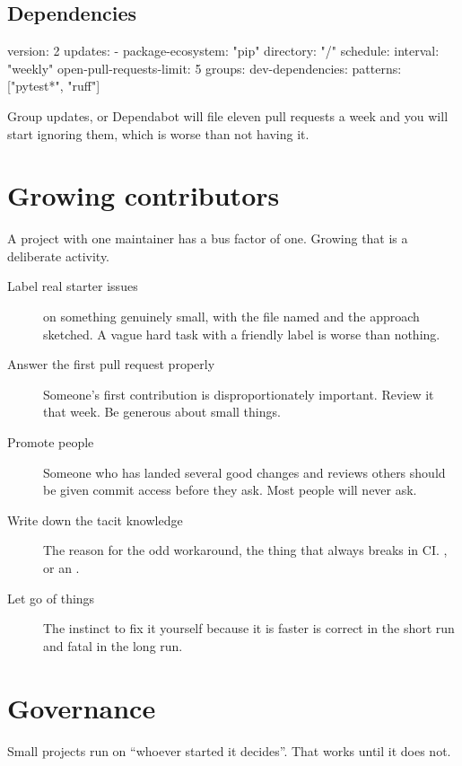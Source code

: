 \documentclass[11pt]{article}
\begin{document}
\subsection{Dependencies}

\begin{terminal}
version: 2
updates:
  - package-ecosystem: "pip"
    directory: "/"
    schedule: {interval: "weekly"}
    open-pull-requests-limit: 5
    groups:
      dev-dependencies:
        patterns: ["pytest*", "ruff"]
\end{terminal}

Group updates, or Dependabot will file eleven pull requests a week and you will start
ignoring them, which is worse than not having it.

\section{Growing contributors}

A project with one maintainer has a bus factor of one. Growing that is a deliberate
activity.

\begin{description}
  \item[Label real starter issues]  on something genuinely
    small, with the file named and the approach sketched. A vague hard task with a
    friendly label is worse than nothing.
  \item[Answer the first pull request properly] Someone's first contribution is
    disproportionately important. Review it that week. Be generous about small
    things.
  \item[Promote people] Someone who has landed several good changes and reviews
    others should be given commit access before they ask. Most people will never ask.
  \item[Write down the tacit knowledge] The reason for the odd workaround, the thing
    that always breaks in CI. , or an .
  \item[Let go of things] The instinct to fix it yourself because it is faster is
    correct in the short run and fatal in the long run.
\end{description}

\section{Governance}

Small projects run on ``whoever started it decides''. That works until it does not.
\end{document}
